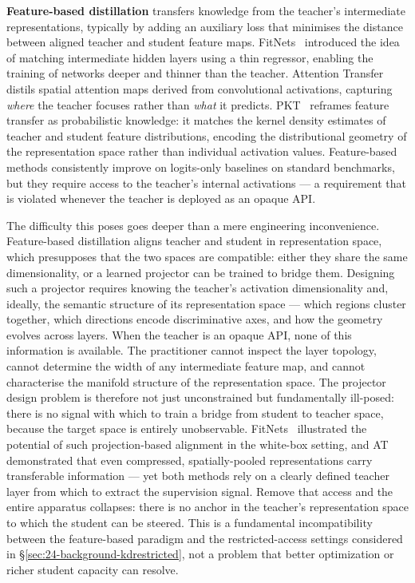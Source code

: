 \begin{foldable}
  \textbf{Feature-based distillation} transfers knowledge from the teacher's intermediate representations, typically by adding an auxiliary loss that minimises the distance between aligned teacher and student feature maps.
  FitNets~\cite{romero2014fitnets} introduced the idea of matching intermediate hidden layers using a thin regressor, enabling the training of networks deeper and thinner than the teacher.
  Attention Transfer~\cite{zagoruyko2016paying} distils spatial attention maps derived from convolutional activations, capturing \emph{where} the teacher focuses rather than \emph{what} it predicts.
  PKT~\cite{passalis2018learning} reframes feature transfer as probabilistic knowledge: it matches the kernel density estimates of teacher and student feature distributions, encoding the distributional geometry of the representation space rather than individual activation values.
  Feature-based methods consistently improve on logits-only baselines on standard benchmarks, but they require access to the teacher's internal activations --- a requirement that is violated whenever the teacher is deployed as an opaque API.
\end{foldable}

\begin{foldable}
  The difficulty this poses goes deeper than a mere engineering inconvenience.
  Feature-based distillation aligns teacher and student in representation space, which presupposes that the two spaces are compatible: either they share the same dimensionality, or a learned projector can be trained to bridge them.
  Designing such a projector requires knowing the teacher's activation dimensionality and, ideally, the semantic structure of its representation space --- which regions cluster together, which directions encode discriminative axes, and how the geometry evolves across layers.
  When the teacher is an opaque \ac{API}, none of this information is available. The practitioner cannot inspect the layer topology, cannot determine the width of any intermediate feature map, and cannot characterise the manifold structure of the representation space.
  The projector design problem is therefore not just unconstrained but fundamentally ill-posed: there is no signal with which to train a bridge from student to teacher space, because the target space is entirely unobservable.
  FitNets~\cite{romero2014fitnets} illustrated the potential of such projection-based alignment in the white-box setting, and AT~\cite{zagoruyko2016paying} demonstrated that even compressed, spatially-pooled representations carry transferable information --- yet both methods rely on a clearly defined teacher layer from which to extract the supervision signal.
  Remove that access and the entire apparatus collapses: there is no anchor in the teacher's representation space to which the student can be steered.
  This is a fundamental incompatibility between the feature-based paradigm and the restricted-access settings considered in \S\ref{sec:24-background-kdrestricted}, not a problem that better optimization or richer student capacity can resolve.
\end{foldable}

